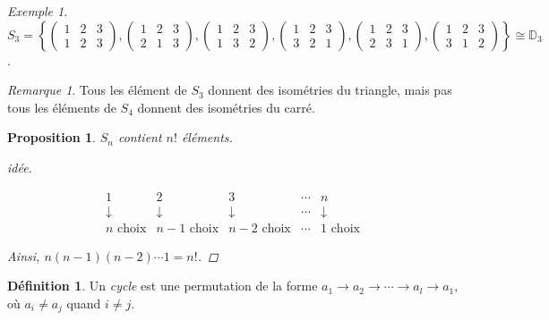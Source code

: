 \documentclass{report}
\newtheorem*{prop}{Proposition}
\theoremstyle{definition}
\newtheorem*{defin}{D\'efinition}
\theoremstyle{remark}
\newtheorem*{exem}{Exemple}
\newtheorem*{rema}{Remarque}
\begin{document}
\begin{exem}
		$S_3 = \left\lbrace \begin{pmatrix}
			1&2&3\\1&2&3
		\end{pmatrix}, \begin{pmatrix}
			1&2&3\\2&1&3
		\end{pmatrix}, \begin{pmatrix}
			1&2&3\\1&3&2
		\end{pmatrix}, \begin{pmatrix}
			1&2&3\\3&2&1
		\end{pmatrix}, \begin{pmatrix}
			1&2&3\\2&3&1
		\end{pmatrix}, \begin{pmatrix}
			1&2&3\\3&1&2
		\end{pmatrix} \right\rbrace \cong \mathbb{D}_3$.
	\end{exem}
	\begin{rema}
		Tous les \'el\'ement de $S_3$ donnent des isom\'etries du triangle, mais pas tous les \'el\'ements de $S_4$ donnent des isom\'etries du carr\'e.
	\end{rema}
	\begin{prop}
		$S_n$ contient $n!$ \'el\'ements.
		\begin{proof}[id\'ee]~

			\[
			\begin{matrix}
				1&2&3&\dotsb&n\\
				\downarrow&\downarrow&\downarrow&\dotsb&\downarrow\\
				n\text{ choix}&n-1\text{ choix}&n-2\text{ choix}&\dotsb&1\text{ choix}
			\end{matrix}
			\]

			Ainsi, $n(n-1)(n-2)\dotsb1 = n!$.
			\renewcommand{\qedsymbol}{\#}
		\end{proof}
		\renewcommand{\qedsymbol}{$\square$}
	\end{prop}
	\begin{defin}
		Un \emph{cycle} est une permutation de la forme $a_1 \to a_2 \to \dotsb \to a_l \to a_1$, o\`u $a_i \neq a_j$ quand $i \neq j$.
		\begin{center}
		\end{center}
	\end{defin}
\end{document}
